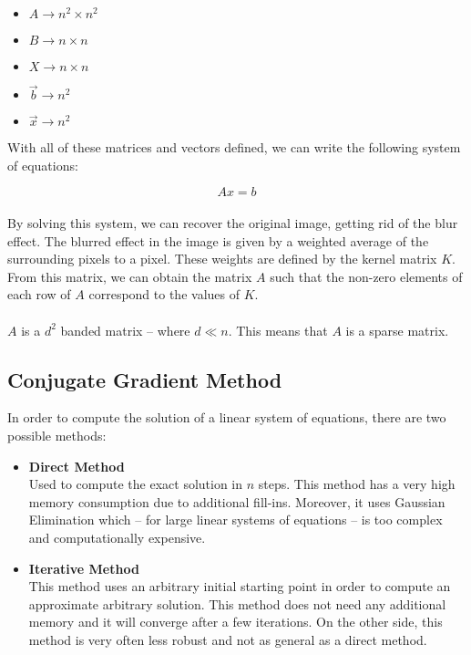 \documentclass{article}
\begin{document}
\begin{itemize}
	\item $A \rightarrow n^2 \times n^2$
	\item $B \rightarrow n \times n$
	\item $X \rightarrow n \times n$
	\item $\overrightarrow{b} \rightarrow n^2$
	\item $\overrightarrow{x} \rightarrow n^2$
\end{itemize}
With all of these matrices and vectors defined, we can write the following system of equations:

\[ Ax = b \] \\
By solving this system, we can recover the original image, getting rid of the blur effect. The blurred effect in the image is given by a weighted average of the surrounding pixels to a pixel. These weights are defined by the kernel matrix $K$. From this matrix, we can obtain the matrix $A$ such that the non-zero elements of each row of $A$ correspond to the values of $K$. \\ \\
$A$ is a $d^2$ banded matrix -- where $d \ll n$. This means that $A$ is a sparse matrix.

\subsection{Conjugate Gradient Method}
In order to compute the solution of a linear system of equations, there are two possible methods:

\begin{itemize}
	\item \textbf{Direct Method}
	\vspace{.2cm} \\
	Used to compute the exact solution in $n$ steps. This method has a very high memory consumption due to additional fill-ins. Moreover, it uses Gaussian Elimination which -- for large linear systems of equations -- is too complex and computationally expensive.
	
	\item \textbf{Iterative Method}
	\vspace{.2cm} \\
	This method uses an arbitrary initial starting point in order to compute an approximate arbitrary solution. This method does not need any additional memory and it will converge after a few iterations. On the other side, this method is very often less robust and not as general as a direct method.
\end{itemize}
\end{document}
